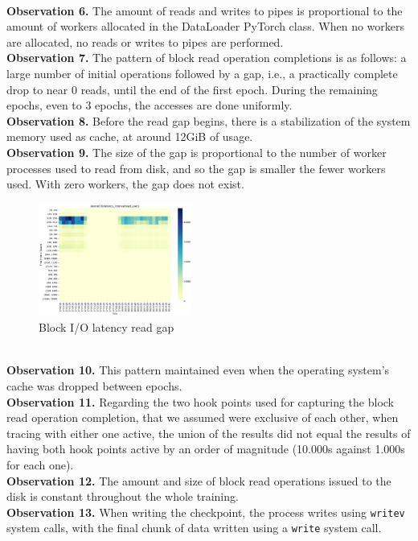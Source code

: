 \documentclass[conference]{IEEEtran}
\begin{document}
\\
\textbf{Observation 6.} The amount of reads and writes to pipes is proportional to the amount of workers allocated in the DataLoader PyTorch class. When no workers are allocated, no reads or writes to pipes are performed.
\\
\textbf{Observation 7.} The pattern of block read operation completions is as follows: a large number of initial operations followed by a gap, i.e., a practically complete drop to near 0 reads, until the end of the first epoch. During the remaining epochs, even to 3 epochs, the accesses are done uniformly.
\\
\textbf{Observation 8.} Before the read gap begins, there is a stabilization of the system memory used as cache, at around 12GiB of usage.
\\
\textbf{Observation 9.} The size of the gap is proportional to the number of worker processes used to read from disk, and so the gap is smaller the fewer workers used. With zero workers, the gap does not exist.
\begin{figure}[htbp]
	\centering
	\includegraphics[width=0.45\textwidth]{images/biolatency_gap.pdf}
	\caption{Block I/O latency read gap}
	\label{fig:biogap}
\end{figure}
\\
\textbf{Observation 10.} This pattern maintained even when the operating system's cache was dropped between epochs.
\\
\textbf{Observation 11.} Regarding the two hook points used for capturing the block read operation completion, that we assumed were exclusive of each other, when tracing with either one active, the union of the results did not equal the results of having both hook points active by an order of magnitude (10.000s against 1.000s for each one).
\\
\textbf{Observation 12.} The amount and size of block read operations issued to the disk is constant throughout the whole training.
\\
\textbf{Observation 13.} When writing the checkpoint, the process writes using \texttt{writev} system calls, with the final chunk of data written using a \texttt{write} system call.
\end{document}
